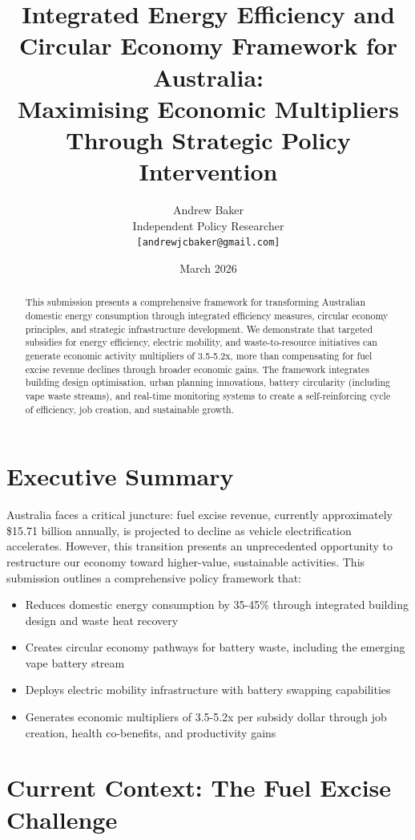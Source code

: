 \documentclass[12pt,a4paper]{article}
\title{\textbf{Integrated Energy Efficiency and Circular Economy Framework for Australia: \\ Maximising Economic Multipliers Through Strategic Policy Intervention}}
\author{Andrew Baker \\ Independent Policy Researcher \\ \texttt{[andrewjcbaker@gmail.com]}}
\date{March 2026}
\begin{document}
\maketitle

\begin{abstract}
This submission presents a comprehensive framework for transforming Australian domestic energy consumption through integrated efficiency measures, circular economy principles, and strategic infrastructure development. We demonstrate that targeted subsidies for energy efficiency, electric mobility, and waste-to-resource initiatives can generate economic activity multipliers of 3.5-5.2x, more than compensating for fuel excise revenue declines through broader economic gains. The framework integrates building design optimisation, urban planning innovations, battery circularity (including vape waste streams), and real-time monitoring systems to create a self-reinforcing cycle of efficiency, job creation, and sustainable growth.
\end{abstract}

\tableofcontents
\newpage

\section{Executive Summary}

Australia faces a critical juncture: fuel excise revenue, currently approximately \$15.71 billion annually, is projected to decline as vehicle electrification accelerates. However, this transition presents an unprecedented opportunity to restructure our economy toward higher-value, sustainable activities. This submission outlines a comprehensive policy framework that:

\begin{itemize}
    \item Reduces domestic energy consumption by 35-45\% through integrated building design and waste heat recovery
    \item Creates circular economy pathways for battery waste, including the emerging vape battery stream
    \item Deploys electric mobility infrastructure with battery swapping capabilities
    \item Generates economic multipliers of 3.5-5.2x per subsidy dollar through job creation, health co-benefits, and productivity gains
\end{itemize}

\section{Current Context: The Fuel Excise Challenge}
\end{document}
